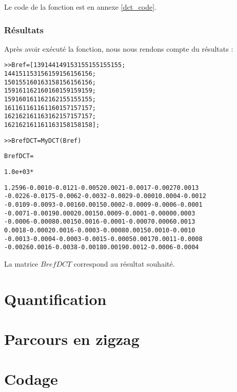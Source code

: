 \documentclass[a4paper, 12pt]{article}
\begin{document}
Le code de la fonction est en annexe \ref{dct_code}.

\subsubsection{R\'esultats}
\label{sec:Resultats}

Après avoir exécuté la fonction, nous nous rendons compte du résultats : 

\begin{alltt}
>> Bref=[	139 144 149 153 155 155 155 155;
					144 151 153 156 159 156 156 156;
					150 155 160 163 158 156 156 156;
					159 161 162 160 160 159 159 159;
					159 160 161 162 162 155 155 155;
					161 161 161 161 160 157 157 157;
					162 162 161 163 162 157 157 157;
					162 162 161 161 163 158 158 158];

>> BrefDCT = MyDCT(Bref)

BrefDCT =

   1.0e+03 *

 1.2596   -0.0010   -0.0121   -0.0052    0.0021   -0.0017   -0.0027    0.0013
-0.0226   -0.0175   -0.0062   -0.0032   -0.0029   -0.0001    0.0004   -0.0012
-0.0109   -0.0093   -0.0016    0.0015    0.0002   -0.0009   -0.0006   -0.0001
-0.0071   -0.0019    0.0002    0.0015    0.0009   -0.0001   -0.0000    0.0003
-0.0006   -0.0008    0.0015    0.0016   -0.0001   -0.0007    0.0006    0.0013
 0.0018   -0.0002    0.0016   -0.0003   -0.0008    0.0015    0.0010   -0.0010
-0.0013   -0.0004   -0.0003   -0.0015   -0.0005    0.0017    0.0011   -0.0008
-0.0026    0.0016   -0.0038   -0.0018    0.0019    0.0012   -0.0006   -0.0004
\end{alltt}

La matrice $BrefDCT$ correspond au résultat souhaité. \\



\section{Quantification}



\section{Parcours en zigzag}

\section{Codage}
\end{document}
